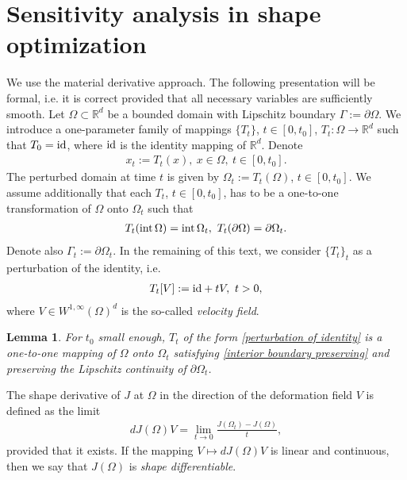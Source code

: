 \documentclass[oneside,11pt]{book}
\numberwithin{equation}{section}
\newtheorem{lemma}{Lemma}[section]
\begin{document}
\section{Sensitivity analysis in shape optimization}
We use the material derivative approach. The following presentation will be formal, i.e. it is correct provided that all necessary variables are sufficiently smooth. Let $\Omega\subset\mathbb{R}^d$ be a bounded domain with Lipschitz boundary $\Gamma := \partial\Omega$. We introduce a one-parameter family of mappings $\{T_t\}$, $t\in[0,t_0]$, $T_t:\Omega\to\mathbb{R}^d$ such that $T_0 = {\rm id}$, where ${\rm id}$ is the identity mapping of $\mathbb{R}^d$. Denote
\begin{align}
    x_t := T_t(x),\ x\in\Omega,\ t\in[0,t_0].
\end{align}
The perturbed domain at time $t$ is given by $\Omega_t := T_t(\Omega)$, $t\in[0,t_0]$. We assume additionally that each $T_t$, $t\in[0,t_0]$, has to be a one-to-one transformation of $\Omega$ onto $\Omega_t$ such that
\begin{align}
    \label{interior boundary preserving}
    T_t({\rm int}\,\Omega) = {\rm int}\,\Omega_t,\ T_t(\partial\Omega) = \partial\Omega_t.
\end{align}
Denote also $\Gamma_t := \partial\Omega_t$. In the remaining of this text, we consider $\{T_t\}_t$ as a perturbation of the identity, i.e.
\begin{align}
    \label{perturbation of identity}
    T_t[V] := {\rm id} + tV,\ t > 0,
\end{align} 
where $V\in W^{1,\infty}(\Omega)^d$ is the so-called \textit{velocity field}.

\begin{lemma}
    For $t_0$ small enough, $T_t$ of the form \eqref{perturbation of identity} is a one-to-one mapping of $\Omega$ onto $\Omega_t$ satisfying \eqref{interior boundary preserving} and preserving the Lipschitz continuity of $\partial\Omega_t$.
\end{lemma}

The shape derivative of $J$ at $\Omega$ in the direction of the deformation field $V$ is defined as the limit
\begin{align}
    dJ(\Omega)V = \lim_{t\to 0} \frac{J(\Omega_t) - J(\Omega)}{t},
\end{align}
provided that it exists. If the mapping $V\mapsto dJ(\Omega)V$ is linear and continuous, then we say that $J(\Omega)$ is \emph{shape differentiable}.
\end{document}
